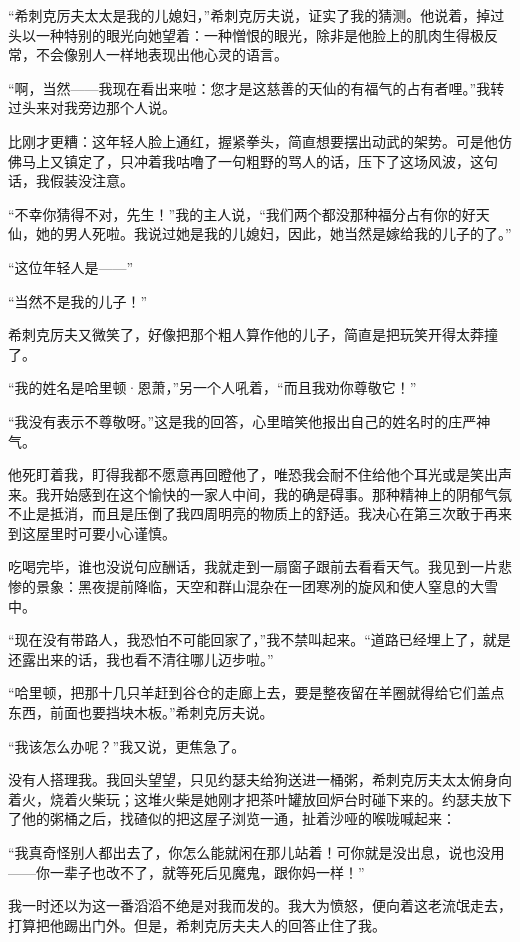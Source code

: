 \par “希刺克厉夫太太是我的儿媳妇，”希刺克厉夫说，证实了我的猜测。他说着，掉过头以一种特别的眼光向她望着：一种憎恨的眼光，除非是他脸上的肌肉生得极反常，不会像别人一样地表现出他心灵的语言。
\par “啊，当然——我现在看出来啦：您才是这慈善的天仙的有福气的占有者哩。”我转过头来对我旁边那个人说。
\par 比刚才更糟：这年轻人脸上通红，握紧拳头，简直想要摆出动武的架势。可是他仿佛马上又镇定了，只冲着我咕噜了一句粗野的骂人的话，压下了这场风波，这句话，我假装没注意。
\par “不幸你猜得不对，先生！”我的主人说，“我们两个都没那种福分占有你的好天仙，她的男人死啦。我说过她是我的儿媳妇，因此，她当然是嫁给我的儿子的了。”
\par “这位年轻人是——”
\par “当然不是我的儿子！”
\par 希刺克厉夫又微笑了，好像把那个粗人算作他的儿子，简直是把玩笑开得太莽撞了。
\par “我的姓名是哈里顿·恩萧，”另一个人吼着，“而且我劝你尊敬它！”
\par “我没有表示不尊敬呀。”这是我的回答，心里暗笑他报出自己的姓名时的庄严神气。
\par 他死盯着我，盯得我都不愿意再回瞪他了，唯恐我会耐不住给他个耳光或是笑出声来。我开始感到在这个愉快的一家人中间，我的确是碍事。那种精神上的阴郁气氛不止是抵消，而且是压倒了我四周明亮的物质上的舒适。我决心在第三次敢于再来到这屋里时可要小心谨慎。
\par 吃喝完毕，谁也没说句应酬话，我就走到一扇窗子跟前去看看天气。我见到一片悲惨的景象：黑夜提前降临，天空和群山混杂在一团寒冽的旋风和使人窒息的大雪中。
\par “现在没有带路人，我恐怕不可能回家了，”我不禁叫起来。“道路已经埋上了，就是还露出来的话，我也看不清往哪儿迈步啦。”
\par “哈里顿，把那十几只羊赶到谷仓的走廊上去，要是整夜留在羊圈就得给它们盖点东西，前面也要挡块木板。”希刺克厉夫说。
\par “我该怎么办呢？”我又说，更焦急了。
\par 没有人搭理我。我回头望望，只见约瑟夫给狗送进一桶粥，希刺克厉夫太太俯身向着火，烧着火柴玩；这堆火柴是她刚才把茶叶罐放回炉台时碰下来的。约瑟夫放下了他的粥桶之后，找碴似的把这屋子浏览一通，扯着沙哑的喉咙喊起来：
\par “我真奇怪别人都出去了，你怎么能就闲在那儿站着！可你就是没出息，说也没用——你一辈子也改不了，就等死后见魔鬼，跟你妈一样！”
\par 我一时还以为这一番滔滔不绝是对我而发的。我大为愤怒，便向着这老流氓走去，打算把他踢出门外。但是，希刺克厉夫夫人的回答止住了我。
